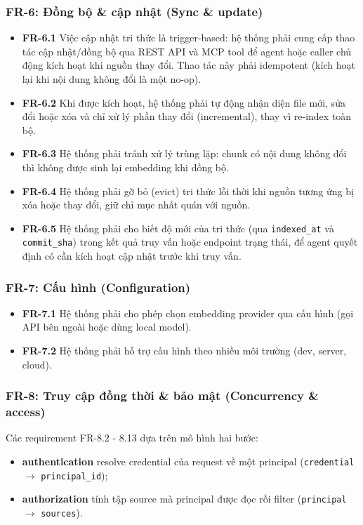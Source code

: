 \subsubsection*{FR-6: Đồng bộ \& cập nhật (Sync \& update)}

\begin{itemize}
  \item \textbf{FR-6.1} Việc cập nhật tri thức là trigger-based: hệ thống phải cung cấp thao tác cập nhật/đồng bộ qua REST API và MCP tool để agent hoặc caller chủ động kích hoạt khi nguồn thay đổi. Thao tác này phải idempotent (kích hoạt lại khi nội dung không đổi là một no-op).
  \item \textbf{FR-6.2} Khi được kích hoạt, hệ thống phải tự động nhận diện file mới, sửa đổi hoặc xóa và chỉ xử lý phần thay đổi (incremental), thay vì re-index toàn bộ.
  \item \textbf{FR-6.3} Hệ thống phải tránh xử lý trùng lặp: chunk có nội dung không đổi thì không được sinh lại embedding khi đồng bộ.
  \item \textbf{FR-6.4} Hệ thống phải gỡ bỏ (evict) tri thức lỗi thời khi nguồn tương ứng bị xóa hoặc thay đổi, giữ chỉ mục nhất quán với nguồn.
  \item \textbf{FR-6.5} Hệ thống phải cho biết độ mới của tri thức (qua \texttt{indexed\_at} và \texttt{commit\_sha}) trong kết quả truy vấn hoặc endpoint trạng thái, để agent quyết định có cần kích hoạt cập nhật trước khi truy vấn.
\end{itemize}

\subsubsection*{FR-7: Cấu hình (Configuration)}

\begin{itemize}
  \item \textbf{FR-7.1} Hệ thống phải cho phép chọn embedding provider qua cấu hình (gọi API bên ngoài hoặc dùng local model).
  \item \textbf{FR-7.2} Hệ thống phải hỗ trợ cấu hình theo nhiều môi trường (dev, server, cloud).
\end{itemize}

\subsubsection*{FR-8: Truy cập đồng thời \& bảo mật (Concurrency \& access)}

Các requirement FR-8.2 - 8.13 dựa trên mô hình hai bước:
\begin{itemize}
  \item \textbf{authentication} resolve credential của request về một principal (\texttt{credential} $\rightarrow$ \texttt{principal\_id});
  \item \textbf{authorization} tính tập source mà principal được đọc rồi filter (\texttt{principal} $\rightarrow$ \texttt{sources}).
\end{itemize}

